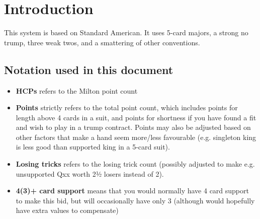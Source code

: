 \chapter*{Introduction}

This system is based on Standard American. It uses 5-card majors, a strong no trump, three weak
twos, and a smattering of other conventions.

\section*{Notation used in this document}

\begin{itemize}
    \item \textbf{HCPs} refers to the Milton point count
    \item \textbf{Points} strictly refers to the total point count, which includes points for length
        above 4 cards in a suit, and points for shortness if you have found a fit and wish to play
        in a trump contract. Points may also be adjusted based on other factors that make a hand
        seem more/less favourable (e.g. singleton king is less good than supported king in a 5-card
        suit).
    \item \textbf{Losing tricks} refers to the losing trick count (possibly adjusted to make e.g.
        unsupported Qxx worth 2½ losers instead of 2).
    \item \textbf{4(3)+ card support} means that you would normally have 4 card support to make this
        bid, but will occasionally have only 3 (although would hopefully have extra values to
        compensate)
\end{itemize}
